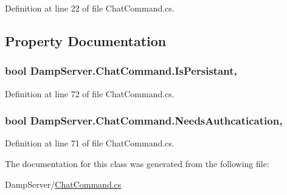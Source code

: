 Definition at line 22 of file Chat\-Command.\-cs.



\subsection{Property Documentation}
\hypertarget{class_damp_server_1_1_chat_command_a70e0b2ad9cc618db0b86bceca91b3668}{
\subsubsection[{Is\-Persistant}]{\setlength{\rightskip}{0pt plus 5cm}bool Damp\-Server.\-Chat\-Command.\-Is\-Persistant\hspace{0.3cm}{\ttfamily [get]}, {\ttfamily [set]}}}\label{class_damp_server_1_1_chat_command_a70e0b2ad9cc618db0b86bceca91b3668}


Definition at line 72 of file Chat\-Command.\-cs.

\hypertarget{class_damp_server_1_1_chat_command_a98c860e6298a3b9b1b153c03b56ea55a}{
\subsubsection[{Needs\-Authcatication}]{\setlength{\rightskip}{0pt plus 5cm}bool Damp\-Server.\-Chat\-Command.\-Needs\-Authcatication\hspace{0.3cm}{\ttfamily [get]}, {\ttfamily [set]}}}\label{class_damp_server_1_1_chat_command_a98c860e6298a3b9b1b153c03b56ea55a}


Definition at line 71 of file Chat\-Command.\-cs.



The documentation for this class was generated from the following file\-:\begin{DoxyCompactItemize}
\item 
Damp\-Server/\hyperlink{_chat_command_8cs}{Chat\-Command.\-cs}\end{DoxyCompactItemize}
